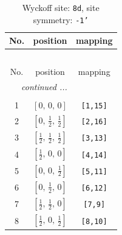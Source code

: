 \documentclass[fleqn,8pt]{jsarticle}
\begin{document}
\begin{longtable}{ccc}
\caption{Wyckoff site: {\tt 8d}, site symmetry: {\tt -1'}}
 \\
 \hline \hline
No. & position & mapping \\ \hline \endfirsthead

\multicolumn{2}{l}{\tablename\ \thetable{}} \\
 \hline \hline
No. & position & mapping \\ \hline \endhead

 \hline \hline
\multicolumn{2}{r}{\footnotesize\it continued ...} \\ \endfoot

 \hline \hline
\multicolumn{2}{r}{} \\ \endlastfoot

1 & $\left[ 0,\, 0,\, 0 \right]$ & {\tt [1,15]} \\ \hline
2 & $\left[ 0,\, \frac{1}{2},\, \frac{1}{2} \right]$ & {\tt [2,16]} \\ \hline
3 & $\left[ \frac{1}{2},\, \frac{1}{2},\, \frac{1}{2} \right]$ & {\tt [3,13]} \\ \hline
4 & $\left[ \frac{1}{2},\, 0,\, 0 \right]$ & {\tt [4,14]} \\ \hline
5 & $\left[ 0,\, 0,\, \frac{1}{2} \right]$ & {\tt [5,11]} \\ \hline
6 & $\left[ 0,\, \frac{1}{2},\, 0 \right]$ & {\tt [6,12]} \\ \hline
7 & $\left[ \frac{1}{2},\, \frac{1}{2},\, 0 \right]$ & {\tt [7,9]} \\ \hline
8 & $\left[ \frac{1}{2},\, 0,\, \frac{1}{2} \right]$ & {\tt [8,10]} \\
\end{longtable}
\renewcommand{\arraystretch}{1.2}
\end{document}
